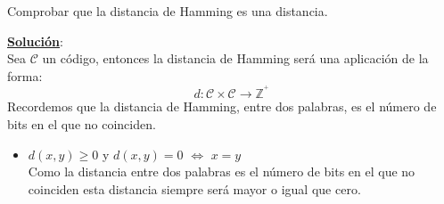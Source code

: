 \begin{ejercicio}
Comprobar que la distancia de Hamming es una distancia.
\end{ejercicio}
\underline{\textbf{Soluci\'on}}:\\
Sea $\mathcal{C}$ un c\'odigo, entonces la distancia de Hamming ser\'a una
aplicaci\'on de la forma:
\begin{displaymath}
d:\mathcal{C}\times \mathcal{C} \longrightarrow \mathbb{Z}^{^+}
\end{displaymath}
Recordemos que la distancia de Hamming, entre dos palabras, es el n\'umero de
bits en el que no coinciden.
\begin{itemize}
\item $d(x,y)\geq 0$ y $d(x,y)=0$ $\Longleftrightarrow$ $x=y$\\
Como la distancia entre dos palabras es el n\'umero de bits en el que no
coinciden esta distancia siempre ser\'a mayor o igual que cero.\\


\end{itemize}
